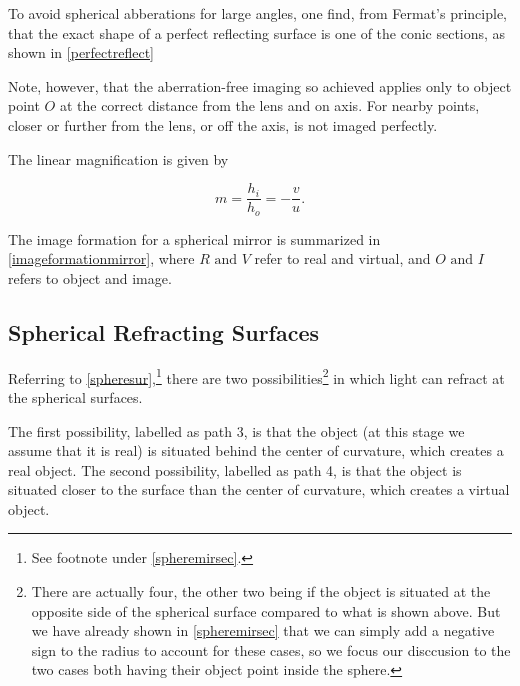 \documentclass[english,a4paper,12pt]{report}
\begin{document}
To avoid spherical abberations for large angles, one find, from Fermat's principle, that the exact shape of a perfect reflecting surface is one of the conic sections, as shown in \cref{perfectreflect} 

Note, however, that the aberration-free imaging so achieved applies only to object point \(O\) at the correct distance from the lens and on axis. For nearby points, closer or further from the lens, or off the axis, is not imaged perfectly.


The linear magnification is given by 

\begin{equation}
    m = \frac{h_{i} }{h_{o} } = -\frac{ v}{ u}.  
\end{equation}

The image formation for a spherical mirror is summarized in \cref{imageformationmirror}, where \(R \text { and }  V\) refer to real and virtual, and \(O \text { and } I\) refers to object and image.


\subsection{Spherical Refracting Surfaces}

Referring to \cref{spheresur},\footnote{See footnote under \cref{spheremirsec}.} there are two possibilities\footnote{There are actually four, the other two being if the object is situated at the opposite side of the spherical surface compared to what is shown above. But we have already shown in \cref{spheremirsec} that we can simply add a negative sign to the radius to account for these cases, so we focus our disccusion to the two cases both having their object point inside the sphere.}  in which light can refract at the spherical surfaces.


The first possibility, labelled as path 3, is that the object (at this stage we assume that it is real) is situated behind the center of curvature, which creates a real object. The second possibility, labelled as path 4, is that the object is situated closer to the surface than the center of curvature, which creates a virtual object.
\end{document}
